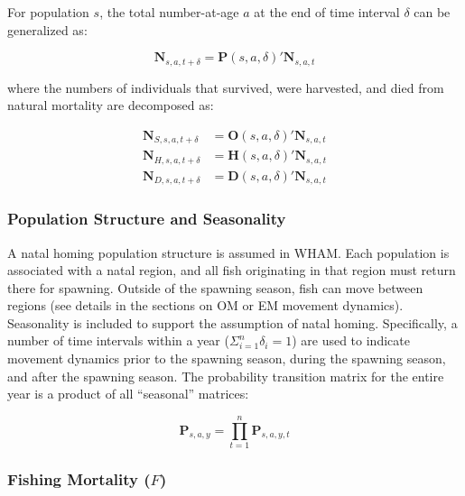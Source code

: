\documentclass[
  12pt,
]{article}
\begin{document}
For population \(s\), the total number-at-age \(a\) at the end of time
interval \(\delta\) can be generalized as:

\begin{equation}
\mathbf{N}_{s,a,t+\delta} = \mathbf{P}(s,a,\delta)' \mathbf{N}_{s,a,t}
\end{equation}

where the numbers of individuals that survived, were harvested, and died
from natural mortality are decomposed as:

\begin{equation}
\begin{aligned}
\mathbf{N}_{S,s,a,t+\delta} &= \mathbf{O}(s,a,\delta)' \mathbf{N}_{s,a,t} \\
\mathbf{N}_{H,s,a,t+\delta} &= \mathbf{H}(s,a,\delta)' \mathbf{N}_{s,a,t} \\
\mathbf{N}_{D,s,a,t+\delta} &= \mathbf{D}(s,a,\delta)' \mathbf{N}_{s,a,t}
\end{aligned}
\end{equation}

\hypertarget{population-structure-and-seasonality}{%
\subsubsection*{Population Structure and
Seasonality}\label{population-structure-and-seasonality}}

A natal homing population structure is assumed in WHAM. Each population
is associated with a natal region, and all fish originating in that
region must return there for spawning. Outside of the spawning season,
fish can move between regions (see details in the sections on OM or EM
movement dynamics). Seasonality is included to support the assumption of
natal homing. Specifically, a number of time intervals within a year
(\(\Sigma_{i=1}^{n} \delta_i = 1\)) are used to indicate movement
dynamics prior to the spawning season, during the spawning season, and
after the spawning season. The probability transition matrix for the
entire year is a product of all ``seasonal'' matrices:

\begin{equation}
\mathbf{P}_{s,a,y} = \prod^{n}_{t=1} \mathbf{P}_{s,a,y,t}
\end{equation}

\hypertarget{fishing-mortality-f}{%
\subsubsection*{\texorpdfstring{Fishing Mortality
(\(F\))}{Fishing Mortality (F)}}\label{fishing-mortality-f}}
\end{document}
